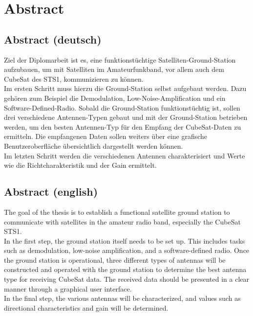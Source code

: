 \chapter*{Abstract}
\label{chap:abstr}
\vspace{-1cm}

\section{Abstract (deutsch)}
\label{sec:abstr-de}
\vspace{-1cm}
Ziel der Diplomarbeit ist es, eine funktionstüchtige Satelliten-Ground-Station aufzubauen, um mit 
Satelliten im Amateurfunkband, vor allem auch dem CubeSat des STS1, kommunizieren zu können.\\
Im ersten Schritt muss hierzu die Ground-Station selbst aufgebaut werden. Dazu gehören zum 
Beispiel die Demodulation, Low-Noise-Amplification und ein Software-Defined-Radio. Sobald die 
Ground-Station funktionstüchtig ist, sollen drei verschiedene Antennen-Typen gebaut und mit der 
Ground-Station betrieben werden, um den besten Antennen-Typ für den Empfang der CubeSat-Daten zu ermitteln. Die empfangenen Daten sollen weiters über eine grafische Benutzeroberfläche 
übersichtlich dargestellt werden können.\\
Im letzten Schritt werden die verschiedenen Antennen charakterisiert und Werte wie die Richtcharakteristik und der Gain ermittelt.

\section{Abstract (english)}
\label{sec:abstr-en}
\vspace{-1cm}
The goal of the thesis is to establish a functional satellite ground station to communicate with satellites in the amateur radio band, especially the CubeSat STS1.\\
In the first step, the ground station itself needs to be set up. This includes tasks such as demodulation, low-noise amplification, and a software-defined radio. Once the ground station is operational, three different types of antennas will be constructed and operated with the ground station to determine the best antenna type for receiving CubeSat data. The received data should be presented in a clear manner through a graphical user interface.\\
In the final step, the various antennas will be characterized, and values such as directional characteristics and gain will be determined.